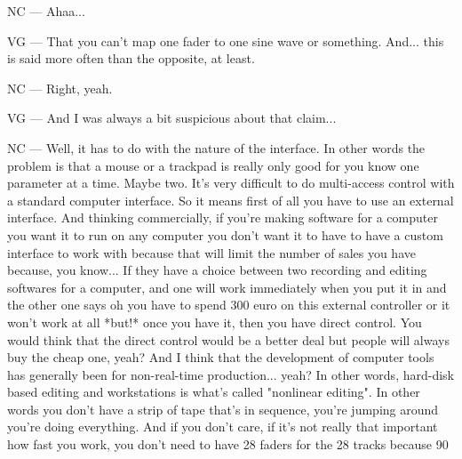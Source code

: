NC — Ahaa... 

VG — That you can't map one fader to one sine wave or something. And... this is said more often than the opposite, at least. 

NC — Right, yeah. 

VG — And I was always a bit suspicious about that claim... 

NC — Well, it has to do with the nature of the interface. In other words the problem is that a mouse or a trackpad is really only good for you know one parameter at a time. Maybe two. It's very difficult to do multi-access control with a standard computer interface. So it means first of all you have to use an external interface. And thinking commercially, if you're making software for a computer you want it to run on any computer you don't want it to have to have a custom interface to work with because that will limit the number of sales you have because, you know... If they have a choice between two recording and editing softwares for a computer, and one will work immediately when you put it in and the other one says oh you have to spend 300 euro on this external controller or it won't work at all *but!* once you have it, then you have direct control. You would think that the direct control would be a better deal but people will always buy the cheap one, yeah? And I think that the development of computer tools has generally been for non-real-time  production... yeah? In other words, hard-disk based editing and workstations is what's called "nonlinear editing". In other words you don't have a strip of tape that's in sequence, you're jumping around you're doing everything. And if you don't care, if it's not really that important how fast you work, you don't need to have 28 faders for the 28 tracks because 90%